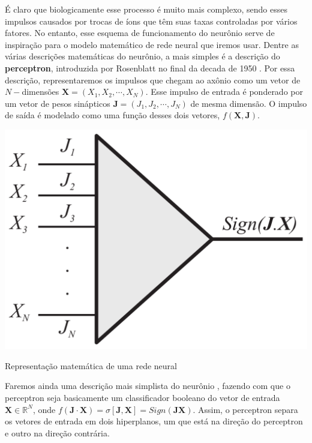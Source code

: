 É claro que biologicamente esse processo é muito mais complexo, sendo
esses impulsos causados por trocas de íons que têm suas taxas controladas
por vários fatores. No entanto, esse esquema de funcionamento do neurônio
serve de inspiração para o modelo matemático de rede neural que iremos
usar. Dentre as várias descrições matemáticas do neurônio, a mais
simples é a descrição do \textbf{perceptron}, introduzida por Rosenblatt
no final da decada de 1950 \citep{Rosenblatt1958}. Por essa descrição,
representaremos os impulsos que chegam ao axônio como um vetor  de
$N-$dimensões $\mathbf{X} = \left( X_1, X_2, \cdots, X_N   \right) $. Esse
impulso de entrada é ponderado por um vetor de pesos sinápticos $\mathbf{J}
= \left( J_1,J_2,\cdots,J_N\right)$ de mesma dimensão.  O impulso de saída é
modelado como uma função desses dois vetores, $ f\left(\mathbf{X},\mathbf{J}
\right) $.

\begin{marginfigure}
    \centering
    \includegraphics[scale = 0.15]{Figures/circuitogay}
    \caption{Representação matemática de uma rede neural}
\end{marginfigure}

Faremos ainda uma descrição mais simplista do neurônio \citep{Engel2004},
fazendo com que o perceptron seja basicamente um classificador booleano
do vetor de entrada $\mathbf{X} \in \mathbb{R}^N$,  onde $ f \left(
\mathbf{J}\cdot\mathbf{X} \right) = \sigma\left[\mathbf{J},\mathbf{X}\right]=
Sign\left(\mathbf{J}\mathbf{X}\right)$. Assim, o perceptron separa os vetores
de entrada em dois hiperplanos, um que está na direção do perceptron
e outro na direção contrária.


